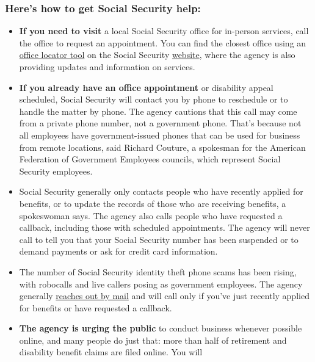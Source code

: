 \hypertarget{heres-how-to-get-social-security-help}{%
\subsubsection{\texorpdfstring{\textbf{Here's how to get Social Security
help:}}{Here's how to get Social Security help:}}\label{heres-how-to-get-social-security-help}}

\begin{itemize}
\item
  \textbf{If you need to visit} a local Social Security office for
  in-person services, call the office to request an appointment. You can
  find the closest office using an
  \href{https://secure.ssa.gov/ICON/main.jsp}{office locator tool} on
  the Social Security \href{https://www.ssa.gov/coronavirus/}{website},
  where the agency is also providing updates and information on
  services.
\item
  \textbf{If you already have an office appointment} or disability
  appeal scheduled, Social Security will contact you by phone to
  reschedule or to handle the matter by phone. The agency cautions that
  this call may come from a private phone number, not a government
  phone. That's because not all employees have government-issued phones
  that can be used for business from remote locations, said Richard
  Couture, a spokesman for the American Federation of Government
  Employees councils, which represent Social Security employees.
\item
  Social Security generally only contacts people who have recently
  applied for benefits, or to update the records of those who are
  receiving benefits, a spokeswoman says. The agency also calls people
  who have requested a callback, including those with scheduled
  appointments. The agency will never call to tell you that your Social
  Security number has been suspended or to demand payments or ask for
  credit card information.
\item
  The number of Social Security identity theft phone scams has been
  rising, with robocalls and live callers posing as government
  employees. The agency generally
  \href{https://faq.ssa.gov/en-US/Topic/article/KA-10018}{reaches out by
  mail} and will call only if you've just recently applied for benefits
  or have requested a callback.
\item
  \textbf{The agency is urging the public} to conduct business whenever
  possible online, and many people do just that: more than half of
  retirement and disability benefit claims are filed online. You will

\end{itemize}
